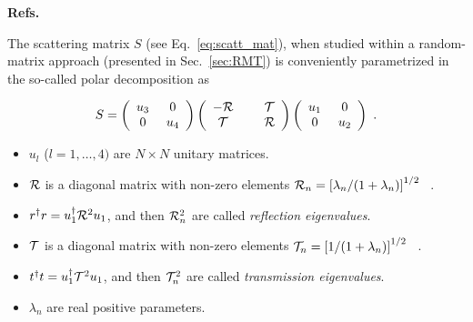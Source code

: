\documentclass[a4paper,10pt]{article}
\newcommand{\nin}{\noindent}
\begin{document}
{\bf Refs.~\cite{St}}

\nin The scattering matrix $S$ (see Eq.~\ref{eq:scatt_mat}), when studied within a random-matrix approach (presented in Sec.~\ref{sec:RMT}) is conveniently parametrized in the so-called polar decomposition as  

\begin{equation}
S = \left( \begin{array}{cc}
u_{3}		& \ 0	\\
0		& \ u_{4}
\end{array} \right)
\left( \begin{array}{cc}
-{\cal R}	& \hspace{0.5cm} {\cal T}	\\
{\cal T}	& \hspace{0.5cm} {\cal R}
\end{array} \right)
\left( \begin{array}{cc}
u_{1}	& \ 0	\\
0	& \ u_{2}
\end{array} \right) \ .
\label{eq:Spol}
\end{equation}

\begin{itemize}

\item $u_{l}$ ($l=1,\ldots,4)$ are $N \! \times \! N$ unitary
matrices.

\item ${\cal R}$ is a diagonal matrix with non-zero elements ${\cal R}_n = \left[\lambda_n/(1+\lambda_n)\right]^{1/2}$ \ . 

\item $r^{\dagger} r = u_{1}^{\dagger} {\cal R}^2 u_{1}$, and then ${\cal R}_n^2$ are called {\it reflection eigenvalues}.

\item ${\cal T}$ is a diagonal matrix with non-zero elements ${\cal T}_n = \left[1/(1+\lambda_n)\right]^{1/2}$ \ .

\item $t^{\dagger} t = u_{1}^{\dagger} {\cal T}^2 u_{1}$, and then ${\cal T}_n^2$ are called {\it transmission eigenvalues}.

\item $\lambda_n$ are real positive parameters.

\end{itemize}
\end{document}
